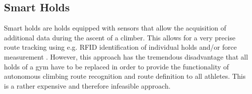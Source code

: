 \subsection{Smart Holds}
Smart holds are holds equipped with sensors that allow the acquisition of additional data during the ascent of a climber. 
This allows for a very precise route tracking using e.g. RFID identification of individual holds and/or force measurement \cite{Kistler:Online, Lechner:Online}. 
However, this approach has the tremendous disadvantage that all holds of a gym have to be replaced in order to provide the functionality of autonomous climbing route recognition and route definition to all athletes. 
This is a rather expensive and therefore infeasible approach.  

\iffalse
	\todo{Describe the currently existing technologies and their advantages and disadvantages. --> MARC} \\ 

	\todo{also mention the overall approach that the position tracking and matches the aggregated data against a database of existing routes}

	testciting \cite{McIntosh:2016:EPH:2858036.2858093}
\fi